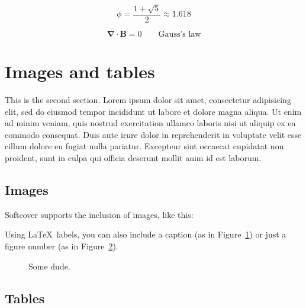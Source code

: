 \begin{equation}
\label{eq:phi}
\phi = \frac{1+\sqrt{5}}{2} \approx 1.618
\end{equation}

\begin{equation}
\label{eq:gauss}
\mathbf{\nabla}\cdot\mathbf{B} = 0 \qquad\mbox{Gauss's law}
\end{equation}

\section{Images and tables}
\label{sec:images_and_tables}

This is the second section. Lorem ipsum dolor sit amet, consectetur adipisicing elit, sed do eiusmod
tempor incididunt ut labore et dolore magna aliqua. Ut enim ad minim veniam,
quis nostrud exercitation ullamco laboris nisi ut aliquip ex ea commodo
consequat. Duis aute irure dolor in reprehenderit in voluptate velit esse
cillum dolore eu fugiat nulla pariatur. Excepteur sint occaecat cupidatat non
proident, sunt in culpa qui officia deserunt mollit anim id est laborum.

\subsection{Images}

Softcover supports the inclusion of images, like this:


Using \LaTeX\ labels, you can also include a caption (as in Figure~\ref{fig:captioned_image}) or just a figure number (as in Figure~\ref{fig:figure_number}).

\begin{figure}[h]
\begin{center}
\end{center}
\caption{Some dude.\label{fig:captioned_image}}
\end{figure}

\begin{figure}[h]
\begin{center}
\end{center}
\caption{\label{fig:figure_number}}
\end{figure}

\subsection{Tables}

